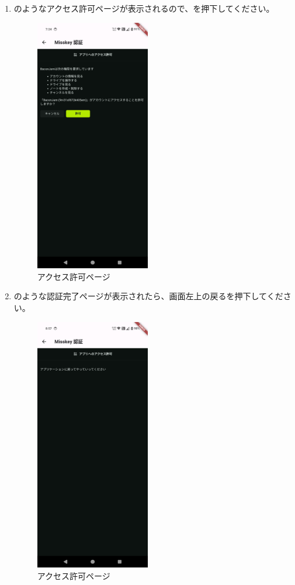 \begin{enumerate}
                \newpage
                \item {}のようなアクセス許可ページが表示されるので、を押下してください。
                    \begin{figure}[htbp]
                        \centering
                        \includegraphics[width=5cm]{./pictures/misskey5.png}
                        \caption{アクセス許可ページ}
                        \label{img:misskey5}
                    \end{figure}

                \newpage
                \item {}のような認証完了ページが表示されたら、画面左上の戻るを押下してください。
                    \begin{figure}[htbp]
                        \centering
                        \includegraphics[width=5cm]{./pictures/misskey6.png}
                        \caption{アクセス許可ページ}
                        \label{img:misskey6}
                    \end{figure}


\end{enumerate}
